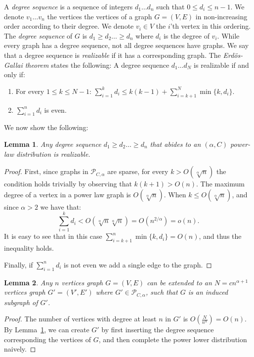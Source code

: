 \documentclass{article}
\newtheorem{lemma}{Lemma}
\theoremstyle{remark}
\begin{document}
A \emph{degree sequence} is a sequence of  integers $d_1 \dots d_n$ such that $0 \leq d_i \leq n-1$.
We denote $v_1 \dots v_n$ the vertices the vertices of a graph $G=(V,E)$ in non-increasing order according to their degree.
We  denote $v_i \in V$ the $i$'th vertex in this ordering.
The \emph{degree sequence} of $G$ is $d_1 \geq d_2 \dots \geq d_n$ where $d_i$ is the degree of $v_i$.
While every graph has a degree sequence, not all degree sequences have graphs.
We say that a degree sequence is \emph{realizable} if it has a corresponding graph. 
The \emph{Erd\"{o}s-Gallai theorem} \cite{erdos1960graphs} states the following:
A degree sequence $d_1 \dots d_N$ is realizable if and only if:
\begin{enumerate}
\item {For every $1 \leq k \leq N-1$:   $\sum_{i=1}^k d_i \leq k(k-1)+ \sum_{i=k+1}^N \min \{k, d_i \}.$}
\item {$\sum_{i=1}^n d_i$ is even.}
\end{enumerate}

We now show the following:
\begin{lemma}\label{power-law-is-realizable}
Any degree sequence $d_1 \geq d_2 \dots \geq d_n$   that abides to  an $(\alpha,C)$ power-law distribution  is realizable.
\end{lemma}
\begin{proof}
First, since graphs in $\mathcal{P}_{C,\alpha}$ are sparse, for every $k> O(\sqrt[\alpha] n)$ the condition holds trivially by observing that $k(k+1)> O(n)$.
The maximum degree of a vertex in a power law graph is $O(\sqrt[\alpha] n)$.
When   $k\leq O(\sqrt[\alpha] n)$, and since  $\alpha>2$ we have that:
$$\sum_{i=1}^k d_i < O(\sqrt[\alpha]n \sqrt[\alpha]n) = O(n^{2/\alpha}) = o(n).$$
It is easy to see that in this case $\sum_{i=k+1}^n \min\{k,d_i\} =O(n)$, and thus the inequality holds.

Finally, if  $\sum_{i=1}^n d_i$ is not even we add a single edge to the graph.
\end{proof}

\begin{lemma}\label{G-is-powerlaw}
Any $n$ vertices graph $G=(V,E)$ can be extended to an $N=cn^{\alpha+1}$ vertices graph $G'=(V',E')$ where $G' \in \mathcal{P}_{C,\alpha}$, such that $G$ is an induced subgraph of $G'$.
\end{lemma}
\begin{proof}
The number of vertices with degree at least $n$ in $G'$  is $O(\frac{N}{n^\alpha}) = O(n)$.
By Lemma~\ref{power-law-is-realizable}, we can create $G'$
 by first inserting the degree sequence corresponding the vertices of  $G$, and then complete the power lower distribution naively.
 
\end{proof}
\end{document}
